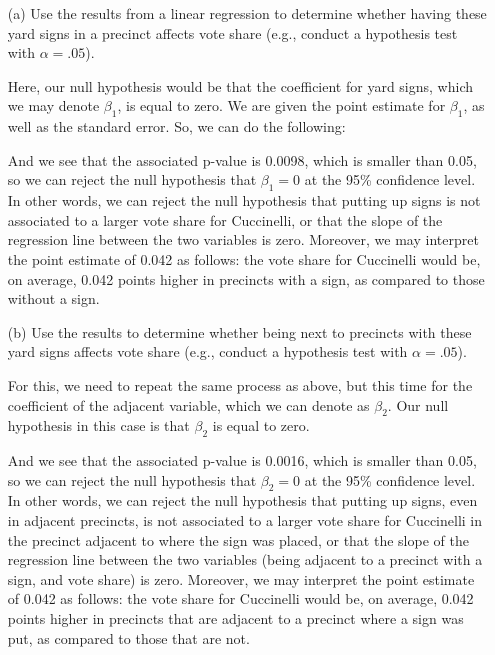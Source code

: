 \documentclass[12pt,letterpaper]{article}
\begin{document}
\newpage
\begin{enumerate}
	\item [(a)] Use the results from a linear regression to determine whether having these yard signs in a precinct affects vote share (e.g., conduct a hypothesis test with $\alpha = .05$).
	\vspace{0.5cm}
	
	Here, our null hypothesis would be that the coefficient for yard signs, which we may denote $\beta_1$, is equal to zero. We are given the point estimate for $\beta_1$, as well as the standard error. 
	So, we can do the following: 
	
	 	
	
	And we see that the associated p-value is 0.0098, which is smaller than 0.05, so we can reject the null hypothesis that $\beta_1 = 0 $ at the 95\% confidence level. In other words, we can reject the null hypothesis that putting up signs is not associated to a larger vote share for Cuccinelli, or that the slope of the regression line between the two variables is zero. Moreover, we may interpret the point estimate of 0.042 as follows: the vote share for Cuccinelli would be, on average, 0.042 points higher in precincts with a sign, as compared to those without a sign. 
	
	\vspace{0.5cm}
	\item [(b)]  Use the results to determine whether being
	next to precincts with these yard signs affects vote
	share (e.g., conduct a hypothesis test with $\alpha = .05$).
	\vspace{0.5cm}
	
	For this, we need to repeat the same process as above, but this time for the coefficient of the adjacent variable, which we can denote as $\beta_2$. Our null hypothesis in this case is that $\beta_2$ is equal to zero. 
	
	\newpage
	 	
	
	And we see that the associated p-value is 0.0016, which is smaller than 0.05, so we can reject the null hypothesis that $\beta_2 = 0 $ at the 95\% confidence level. In other words, we can reject the null hypothesis that putting up signs, even in adjacent precincts, is not associated to a larger vote share for Cuccinelli in the precinct adjacent to where the sign was placed, or that the slope of the regression line between the two variables (being adjacent to a precinct with a sign, and vote share) is zero. Moreover, we may interpret the point estimate of 0.042 as follows: the vote share for Cuccinelli would be, on average, 0.042 points higher in precincts that are adjacent to a precinct where a sign was put, as compared to those that are not. 
	

\end{enumerate}
\end{document}
